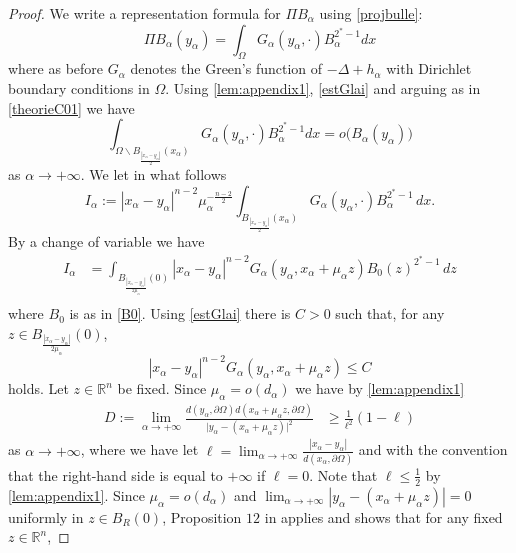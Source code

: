 \documentclass[10pt]{amsart}
\numberwithin{equation}{section}
\newcommand{\R}{\mathbb{R}}
\newcommand{\Om}{\Omega}
\newcommand{\ma}{\mu_\alpha}
\def\la{\alpha}
\def \ma{\mu_{\alpha}}
\def \da{d_{\alpha}}
\def \lal{\lim_{\alpha\to +\infty}}
\theoremstyle{plain}
\theoremstyle{remark}
\begin{document}
\begin{proof}
We write a representation formula for $\Pi B_\alpha$ using \eqref{projbulle}: 
\begin{equation} \label{eq:improvedasympto0}
 \Pi B_\alpha(y_\alpha) = \int_{\Om} G_\alpha(y_\alpha, \cdot) B_\alpha^{2^*-1} dx 
 \end{equation} 
 where as before $G_\alpha$ denotes the Green's function of $- \Delta + h_\alpha$ with Dirichlet boundary conditions in $\Omega$. Using \eqref{lem:appendix1}, \eqref{estGlai} and arguing as in \eqref{theorieC01} we have
\begin{equation} \label{eq:improvedasympto2}
\int_{\Om \backslash B_{\frac{|x_\alpha - y_\alpha|}{2}}(x_\alpha)} G_\alpha(y_\alpha, \cdot)B_\alpha^{2^*-1} dx= o \big( B_\alpha(y_\alpha) \big)  
\end{equation}
 as $\alpha \to +\infty$. We let in what follows
\begin{equation*} 
I_{\alpha}:= |x_\alpha - y_\alpha|^{n-2}\ma^{-\frac{n-2}{2}}\int_{B_{\frac{|x_\alpha - y_\alpha|}{2}}(x_{\alpha})} G_{\la}(y_\alpha,\cdot)B_\alpha^{2^*-1} \, dx. 
\end{equation*}
By a change of variable we have 
\begin{equation}\label{A1alpha}
\begin{aligned}
I_{\alpha} & =\int_{B_{\frac{|x_\alpha - y_\alpha|}{2 \ma }}(0)} |x_\alpha - y_\alpha|^{n-2} G_{\la}(y_\alpha, x_\alpha + \ma z) B_0(z)^{2^*-1} \, dz \\
\end{aligned}
\end{equation}
where $B_0$ is as in \eqref{B0}. Using \eqref{estGlai} there is $C >0$ such that, for any $z \in  B_{\frac{|x_\alpha - y_\alpha|}{2 \ma }}(0)$, 
$$|x_\alpha - y_\alpha|^{n-2} G_{\la}(y_\alpha, x_\alpha + \ma z) \le C  $$
holds. Let $z \in \R^n $ be fixed. Since $\ma=o(\da)$ we have by \eqref{lem:appendix1}
 $$\begin{aligned}
 D:=	\lal   \frac{d(y_\alpha,\partial \Om)d(x_\alpha + \ma z,\partial \Om)}{\big| y_\alpha - (x_\alpha + \ma z) \big|^2 }  & \ge \frac{1}{ \ell^2}(1 - \ell)  
   \end{aligned} $$ 
as $\alpha \to + \infty$, where we have let $\ell = \lim_{\alpha \to + \infty} \frac{ |x_\alpha - y_\alpha|}{d(x_\alpha, \partial \Om)}$ and with the convention that the right-hand side is equal to $+ \infty$ if $\ell = 0$. Note that $\ell \le \frac12$ by \eqref{lem:appendix1}. Since $\ma = o(\da)$ and $\lal |y_\alpha - (x_\alpha + \ma z)|=0$ uniformly in $z \in B_R(0)$, Proposition $12$ in \cite{RobDirichlet} applies and shows that for any fixed $z \in \R^n$, 

\end{proof}
\end{document}
